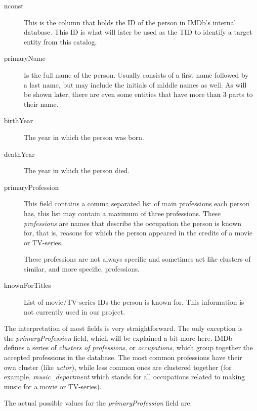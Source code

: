 \documentclass[epsfig,a4paper,11pt,titlepage,twoside,openany]{book}
\begin{document}
\begin{description}
\item[nconst] This is the column that holds the ID of the person in IMDb's internal database. This ID is what will later be used as the TID to identify a target entity from this catalog.

\item[primaryName] Is the full name of the person. Usually consists of a first name followed by a last name, but may include the initials of middle names as well. As will be shown later, there are even some entities that have more than 3 parts to their name.

\item[birthYear] The year in which the person was born.

\item[deathYear] The year in which the person died.

\item[primaryProfession] This field contains a comma separated list of main professions each person has, this list may contain a maximum of three professions. These \textit{professions} are names that describe the occupation the person is known for, that is, reasons for which the person appeared in the credits of a movie or TV-series. 

These professions are not always specific and sometimes act like clusters of similar, and more specific, professions.

\item[knownForTitles] List of movie/TV-series IDs the person is known for. This information is not currently used in our project. 
\end{description}

The interpretation of most fields is very straightforward. The only exception is the \textit{primaryProfession} field, which will be explained a bit more here. IMDb defines a series of \textit{clusters of professions}, or \textit{occupations}, which group together the accepted professions in the database. The most common professions have their own cluster (like \textit{actor}), while less common ones are clustered together (for example, \textit{music\_department} which stands for all occupations related to making music for a movie or TV-series).

The actual possible values for the \textit{primaryProfession} field are: 
\end{document}
